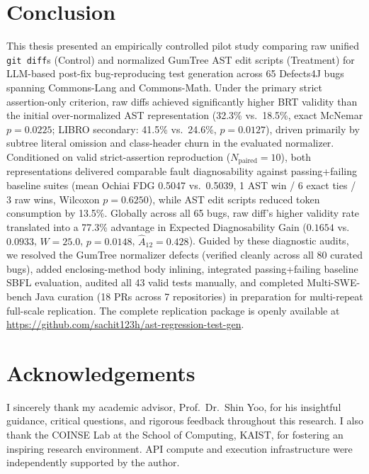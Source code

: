 \documentclass[12pt, a4paper]{article}
\begin{document}
\section{Conclusion}\label{sec:conclusion}

This thesis presented an empirically controlled pilot study comparing raw unified \texttt{git diff}s (Control) and normalized GumTree AST edit scripts (Treatment) for LLM-based post-fix bug-reproducing test generation across 65 Defects4J bugs spanning Commons-Lang and Commons-Math.
Under the primary strict assertion-only criterion, raw diffs achieved significantly higher BRT validity than the initial over-normalized AST representation (32.3\% vs.\ 18.5\%, exact McNemar $p = 0.0225$; LIBRO secondary: 41.5\% vs.\ 24.6\%, $p = 0.0127$), driven primarily by subtree literal omission and class-header churn in the evaluated normalizer.
Conditioned on valid strict-assertion reproduction ($N_{\text{paired}} = 10$), both representations delivered comparable fault diagnosability against passing+failing baseline suites (mean Ochiai FDG 0.5047 vs.\ 0.5039, 1 AST win / 6 exact ties / 3 raw wins, Wilcoxon $p = 0.6250$), while AST edit scripts reduced token consumption by 13.5\%.
Globally across all 65 bugs, raw diff's higher validity rate translated into a 77.3\% advantage in Expected Diagnosability Gain ($0.1654$ vs.\ $0.0933$, $W=25.0$, $p = 0.0148$, $\hat{A}_{12} = 0.428$).
Guided by these diagnostic audits, we resolved the GumTree normalizer defects (verified cleanly across all 80 curated bugs), added enclosing-method body inlining, integrated passing+failing baseline SBFL evaluation, audited all 43 valid tests manually, and completed Multi-SWE-bench Java curation (18 PRs across 7 repositories) in preparation for multi-repeat full-scale replication.
The complete replication package is openly available at \url{https://github.com/sachit123h/ast-regression-test-gen}.

\section*{Acknowledgements}

I sincerely thank my academic advisor, Prof.~Dr.~Shin Yoo, for his insightful guidance, critical questions, and rigorous feedback throughout this research.
I also thank the COINSE Lab at the School of Computing, KAIST, for fostering an inspiring research environment.
API compute and execution infrastructure were independently supported by the author.


\end{document}
